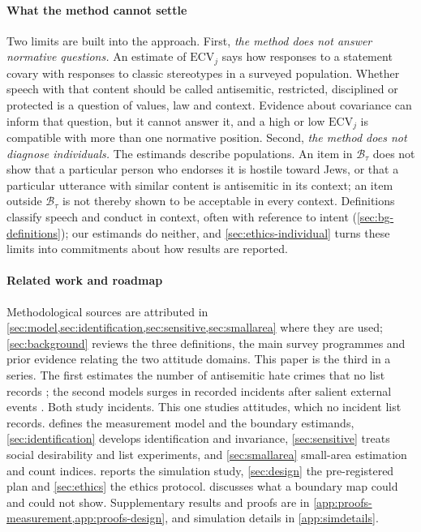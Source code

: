 \paragraph{What the method cannot settle}
Two limits are built into the approach. First, \emph{the method does not
answer normative questions.} An estimate of $\mathrm{ECV}_j$ says how
responses to a statement covary with responses to classic stereotypes in a
surveyed population. Whether speech with that content should be called
antisemitic, restricted, disciplined or protected is a question of values,
law and context. Evidence about covariance can inform that question, but it
cannot answer it, and a high or low $\mathrm{ECV}_j$ is compatible with more
than one normative position. Second, \emph{the method does not diagnose
individuals.} The estimands describe populations. An item in
$\mathcal{B}_\tau$ does not show that a particular person who endorses it is
hostile toward Jews, or that a particular utterance with similar content is
antisemitic in its context; an item outside $\mathcal{B}_\tau$ is not thereby
shown to be acceptable in every context. Definitions classify speech and
conduct in context, often with reference to intent
(\cref{sec:bg-definitions}); our estimands do neither, and
\cref{sec:ethics-individual} turns these limits into commitments about how
results are reported.

\paragraph{Related work and roadmap}
Methodological sources are attributed in
\cref{sec:model,sec:identification,sec:sensitive,sec:smallarea} where they
are used; \cref{sec:background} reviews the three definitions, the main
survey programmes and prior evidence relating the two attitude domains. This
paper is the third in a series. The first estimates the number of
antisemitic hate crimes that no list records
\citep{kornsteinlab2026p1darkfigure}; the second models surges in recorded
incidents after salient external events \citep{kornsteinlab2026p2contagion}.
Both study incidents. This one studies attitudes, which no incident list
records.  defines the measurement model and the boundary
estimands, \cref{sec:identification} develops identification and invariance,
\cref{sec:sensitive} treats social desirability and list experiments, and
\cref{sec:smallarea} small-area estimation and count indices.
 reports the simulation study, \cref{sec:design} the
pre-registered plan and \cref{sec:ethics} the ethics protocol.
 discusses what a boundary map could and could not
show. Supplementary results and proofs are in
\cref{app:proofs-measurement,app:proofs-design}, and simulation details in
\cref{app:simdetails}.
